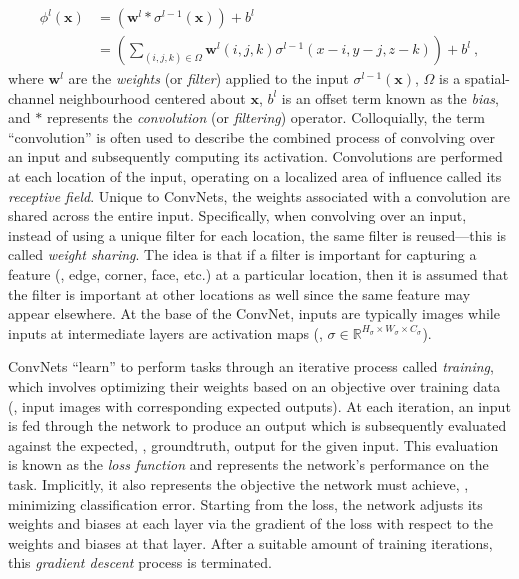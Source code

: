 \begin{equation}
	\begin{aligned}
		\phi^l(\mathbf{x}) &= \left(\mathbf{w}^l * \sigma^{l-1}(\mathbf{x})\right) + b^l\\
		&= \left(\sum_{(i, j, k) \in \Omega} \mathbf{w}^l(i, j, k) \sigma^{l-1}(x - i, y - j, z - k)\right) + b^l\ ,
	\end{aligned}
\end{equation}
where $\mathbf{w}^l$ are the \emph{weights} (or \emph{filter}) applied to the input $\sigma^{l-1}(\mathbf{x})$, $\Omega$ is a spatial-channel neighbourhood centered about $\mathbf{x}$, $b^l$ is an offset term known as the \emph{bias}, and $\ast$ represents the \emph{convolution} (or \emph{filtering}) operator. Colloquially, the term ``convolution'' is often used to describe the combined process of convolving over an input and subsequently computing its activation. Convolutions are performed at each location of the input, operating on a localized area of influence called its \emph{receptive field}. Unique to ConvNets, the weights associated with a convolution are shared across the entire input. Specifically, when convolving over an input, instead of using a unique filter for each location, the same filter is reused---this is called \emph{weight sharing}. The idea is that if a filter is important for capturing a feature (\eg, edge, corner, face, etc.) at a particular location, then it is assumed that the filter is important at other locations as well since the same feature may appear elsewhere.
At the base of the ConvNet, inputs are typically images while inputs at intermediate layers are activation maps (\eg, $\sigma \in \mathbb{R}^{H_\sigma \times W_\sigma \times C_\sigma}$). 

ConvNets ``learn'' to perform tasks through an iterative process called \emph{training}, which involves optimizing their weights based on an objective over training data (\eg, input images with corresponding expected outputs). At each iteration, an input is fed through the network to produce an output which is subsequently evaluated against the expected, \ie, groundtruth, output for the given input. This evaluation is known as the \emph{loss function} and represents the network's performance on the task. Implicitly, it also represents the objective the network must achieve, \eg, minimizing classification error. Starting from the loss, the network adjusts its weights and biases at each layer via the gradient of the loss with respect to the weights and biases at that layer. After a suitable amount of training iterations, this \emph{gradient descent} process is terminated.

